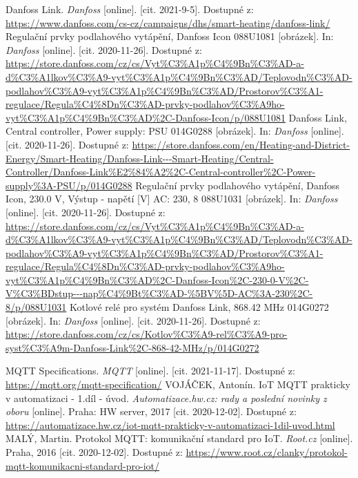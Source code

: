 \begin{thebibliography}{3}
Danfoss Link. \textit{Danfoss} [online]. [cit. 2021-9-5]. Dostupné z: \url{https://www.danfoss.com/cs-cz/campaigns/dhs/smart-heating/danfoss-link/}
Regulační prvky podlahového vytápění, Danfoss Icon 088U1081 [obrázek]. In: \textit{Danfoss} [online]. [cit. 2020-11-26]. Dostupné z: \url{https://store.danfoss.com/cz/cs/Vyt\%C3\%A1p\%C4\%9Bn\%C3\%AD-a-d\%C3\%A1lkov\%C3\%A9-vyt\%C3\%A1p\%C4\%9Bn\%C3\%AD/Teplovodn\%C3\%AD-podlahov\%C3\%A9-vyt\%C3\%A1p\%C4\%9Bn\%C3\%AD/Prostorov\%C3\%A1-regulace/Regula\%C4\%8Dn\%C3\%AD-prvky-podlahov\%C3\%A9ho-vyt\%C3\%A1p\%C4\%9Bn\%C3\%AD\%2C-Danfoss-Icon/p/088U1081}
Danfoss Link, Central controller, Power supply: PSU 014G0288 [obrázek]. In: \textit{Danfoss} [online]. [cit. 2020-11-26]. Dostupné z: \url{https://store.danfoss.com/en/Heating-and-District-Energy/Smart-Heating/Danfoss-Link---Smart-Heating/Central-Controller/Danfoss-Link\%E2\%84\%A2\%2C-Central-controller\%2C-Power-supply\%3A-PSU/p/014G0288}
Regulační prvky podlahového vytápění, Danfoss Icon, 230.0 V, Výstup - napětí [V] AC: 230, 8 088U1031 [obrázek]. In: \textit{Danfoss} [online]. [cit. 2020-11-26]. Dostupné z: \url{https://store.danfoss.com/cz/cs/Vyt\%C3\%A1p\%C4\%9Bn\%C3\%AD-a-d\%C3\%A1lkov\%C3\%A9-vyt\%C3\%A1p\%C4\%9Bn\%C3\%AD/Teplovodn\%C3\%AD-podlahov\%C3\%A9-vyt\%C3\%A1p\%C4\%9Bn\%C3\%AD/Prostorov\%C3\%A1-regulace/Regula\%C4\%8Dn\%C3\%AD-prvky-podlahov\%C3\%A9ho-vyt\%C3\%A1p\%C4\%9Bn\%C3\%AD\%2C-Danfoss-Icon\%2C-230-0-V\%2C-V\%C3\%BDstup---nap\%C4\%9Bt\%C3\%AD-\%5BV\%5D-AC\%3A-230\%2C-8/p/088U1031}
Kotlové relé pro systém Danfoss Link, 868.42 MHz 014G0272 [obrázek]. In: \textit{Danfoss} [online]. [cit. 2020-11-26]. Dostupné z: \url{https://store.danfoss.com/cz/cs/Kotlov\%C3\%A9-rel\%C3\%A9-pro-syst\%C3\%A9m-Danfoss-Link\%2C-868-42-MHz/p/014G0272}

MQTT Specifications. \textit{MQTT} [online]. [cit. 2021-11-17]. Dostupné z: \url{https://mqtt.org/mqtt-specification/}
VOJÁČEK, Antonín. IoT MQTT prakticky v automatizaci - 1.díl - úvod. \textit{Automatizace.hw.cz: rady a poslední novinky z oboru} [online]. Praha: HW server, 2017 [cit. 2020-12-02]. Dostupné z: \url{https://automatizace.hw.cz/iot-mqtt-prakticky-v-automatizaci-1dil-uvod.html}
MALÝ, Martin. Protokol MQTT: komunikační standard pro IoT. \textit{Root.cz} [online]. Praha, 2016 [cit. 2020-12-02]. Dostupné z: \url{https://www.root.cz/clanky/protokol-mqtt-komunikacni-standard-pro-iot/}


\end{thebibliography}
